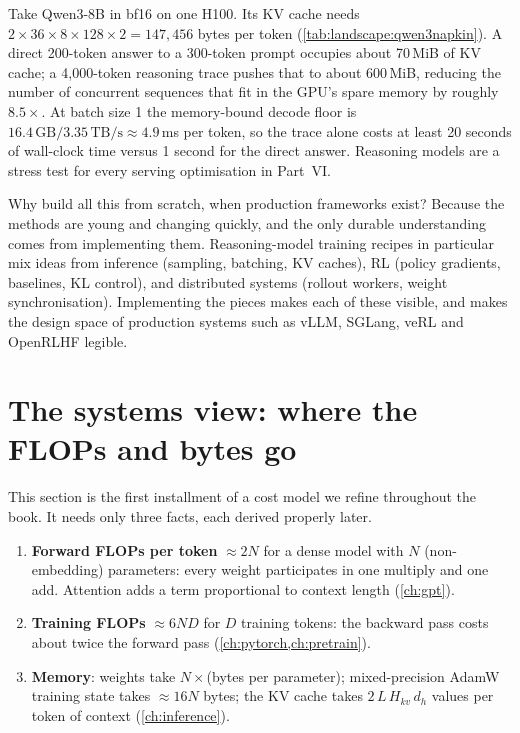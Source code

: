 \begin{napkinmath}
Take Qwen3-8B in bf16 on one H100. Its KV cache needs $2\times36\times8\times128\times2 = 147{,}456$ bytes
per token (\cref{tab:landscape:qwen3napkin}). A direct 200-token answer to a 300-token prompt
occupies about 70\,MiB of KV cache; a 4{,}000-token reasoning trace pushes that to about 600\,MiB,
reducing the number of concurrent sequences that fit in the GPU's spare memory by roughly $8.5\times$. At batch
size 1 the memory-bound decode floor is $16.4\,\text{GB}/3.35\,\text{TB/s} \approx 4.9$\,ms per token, so
the trace alone costs at least 20 seconds of wall-clock time versus 1 second for the direct answer.
Reasoning models are a stress test for every serving optimisation in Part~VI.
\end{napkinmath}

Why build all this from scratch, when production frameworks exist? Because the methods are young and
changing quickly, and the only durable understanding comes from implementing them. Reasoning-model
training recipes in particular mix ideas from inference (sampling, batching, KV caches), RL (policy
gradients, baselines, KL control), and distributed systems (rollout workers, weight synchronisation).
Implementing the pieces makes each of these visible, and makes the design space of production systems
such as vLLM, SGLang, veRL and OpenRLHF legible.

\section{The systems view: where the FLOPs and bytes go}\label{sec:landscape:cost}

This section is the first installment of a cost model we refine throughout the book. It needs only
three facts, each derived properly later.

\begin{enumerate}
\item \textbf{Forward FLOPs per token} $\approx 2N$ for a dense model with $N$ (non-embedding) parameters:
  every weight participates in one multiply and one add. Attention adds a term proportional to context
  length (\cref{ch:gpt}).
\item \textbf{Training FLOPs} $\approx 6ND$ for $D$ training tokens: the backward pass costs about twice the
  forward pass (\cref{ch:pytorch,ch:pretrain}).
\item \textbf{Memory}: weights take $N\times$(bytes per parameter); mixed-precision AdamW training state takes
  $\approx 16N$ bytes; the KV cache takes $2\,L\,H_{kv}\,d_h$ values per token of context
  (\cref{ch:inference}).
\end{enumerate}

